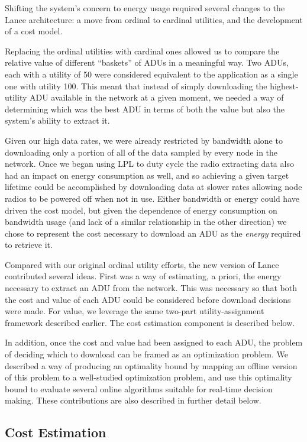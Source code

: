 Shifting the system's concern to energy usage required several changes to the
Lance architecture: a move from ordinal to cardinal utilities, and the
development of a cost model.

Replacing the ordinal utilities with cardinal ones allowed us to compare the
relative value of different ``baskets'' of ADUs in a meaningful way. Two
ADUs, each with a utility of 50 were considered equivalent to the application
as a single one with utility 100.  This meant that instead of simply
downloading the highest-utility ADU available in the network at a given
moment, we needed a way of determining which was the best ADU in terms of
both the value but also the system's ability to extract it.

Given our high data rates, we were already restricted by bandwidth alone to
downloading only a portion of all of the data sampled by every node in the
network.  Once we began using LPL to duty cycle the radio extracting data
also had an impact on energy consumption as well, and so achieving a given
target lifetime could be accomplished by downloading data at slower rates
allowing node radios to be powered off when not in use.  Either bandwidth or
energy could have driven the cost model, but given the dependence of energy
consumption on bandwidth usage (and lack of a similar relationship in the
other direction) we chose to represent the cost necessary to download an ADU
as the \textit{energy} required to retrieve it.

Compared with our original ordinal utility efforts, the new version of Lance
contributed several ideas. First was a way of estimating, a priori,
the energy necessary to extract an ADU from the network. This was necessary
so that both the cost and value of each ADU could be considered before
download decisions were made. For value, we leverage the same two-part
utility-assignment framework described earlier.  The cost estimation
component is described below.

In addition, once the cost and value had been assigned to each ADU, the
problem of deciding which to download can be framed as an optimization
problem. We described a way of producing an optimality bound by mapping an
offline version of this problem to a well-studied optimization problem, and
use this optimality bound to evaluate several online algorithms suitable for
real-time decision making. These contributions are also described in further
detail below.

\subsection{Cost Estimation}
\label{subsec-costassignment}

